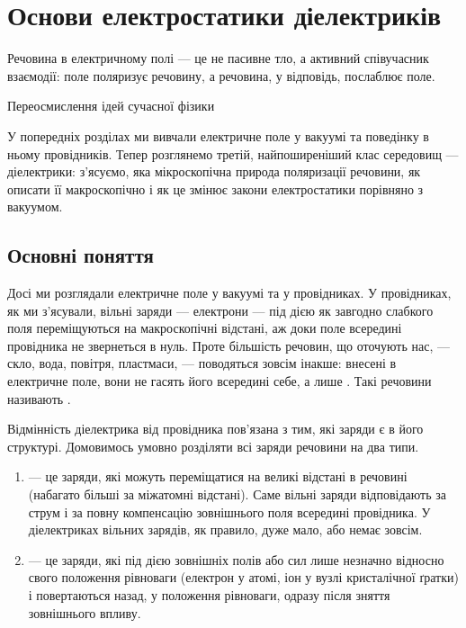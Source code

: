 
\chapter{Основи електростатики діелектриків}\label{\currfilebase}
\graphicspath{{\currfilebase/Pictures}}
\epigraph{Речовина в електричному полі --- це не пасивне тло, а активний співучасник взаємодії: поле поляризує речовину, а речовина, у відповідь,
	послаблює поле.
}{Переосмислення ідей сучасної фізики}


У попередніх розділах ми вивчали електричне поле у вакуумі та поведінку в ньому провідників. Тепер розглянемо третій, найпоширеніший клас середовищ --- діелектрики: з'ясуємо, яка мікроскопічна природа поляризації речовини, як описати її макроскопічно і як це змінює закони електростатики порівняно з вакуумом.

\section{Основні поняття}

Досі ми розглядали електричне поле у вакуумі та у провідниках. У провідниках, як ми з'ясували, вільні заряди --- електрони --- під дією як завгодно
слабкого поля переміщуються на макроскопічні відстані, аж доки поле всередині провідника не звернеться в нуль. Проте більшість речовин, що оточують
нас, --- скло, вода, повітря, пластмаси, --- поводяться зовсім інакше: внесені в електричне поле, вони не гасять його всередині себе, а лише
. Такі речовини називають .

Відмінність діелектрика від провідника пов'язана з тим, які заряди є в його структурі. Домовимось умовно розділяти всі заряди речовини на два типи.

\begin{enumerate}
	\item {} --- це заряди, які можуть переміщатися на великі відстані в речовині (набагато більші за міжатомні відстані). Саме
	      вільні заряди відповідають за струм і за повну компенсацію зовнішнього поля всередині провідника. У діелектриках вільних зарядів, як
	      правило, дуже мало, або немає зовсім.
	\item {} --- це заряди, які під дією зовнішніх полів або сил лише незначно  відносно
	      свого положення рівноваги (електрон у атомі, іон у вузлі кристалічної ґратки) і повертаються назад, у положення рівноваги, одразу після
	      зняття зовнішнього впливу.
\end{enumerate}

